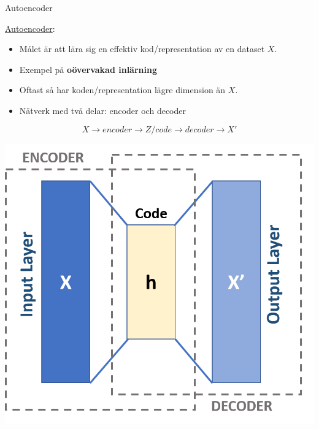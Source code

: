 \documentclass[10pt,english]{beamer}
\begin{document}
\begin{frame}{Autoencoder}
    
    \href{https://en.wikipedia.org/wiki/Autoencoder}{Autoencoder}:
    \begin{itemize}
      \item Målet är att lära sig en effektiv kod/representation av en dataset $X$.
      \item Exempel på \textbf{oövervakad inlärning}
      \item Oftast så har koden/representation lägre dimension än $X$.
      \item Nätverk med två delar: encoder och decoder
    \end{itemize}
        
    \begin{equation*}
        X \rightarrow encoder \rightarrow Z/code \rightarrow decoder \rightarrow X'
    \end{equation*}

    \includegraphics[scale=0.32]{figs/Autoencoder_schema.png}
    
\end{frame}
\end{document}
